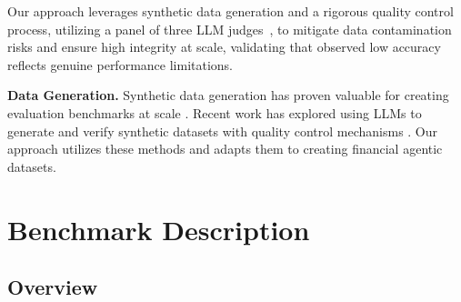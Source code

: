\documentclass[11pt]{article}
\begin{document}
Our approach leverages synthetic data generation and a rigorous quality control process, utilizing a
panel of three LLM judges~\citep{zheng2023judging,verga2024replacing}, to
mitigate data contamination risks and ensure high integrity at scale, validating that observed low accuracy reflects genuine
performance limitations.


\noindent \textbf{Data Generation.}
Synthetic data generation has proven valuable for creating evaluation benchmarks at scale \citep{wang2022selfinstruct}. Recent work has explored using LLMs to generate and verify synthetic datasets with quality control mechanisms \citep{prabhakar2026apigen}. Our approach utilizes these methods and adapts them to creating financial agentic datasets.

\section{Benchmark Description}

\subsection{Overview}
\end{document}
